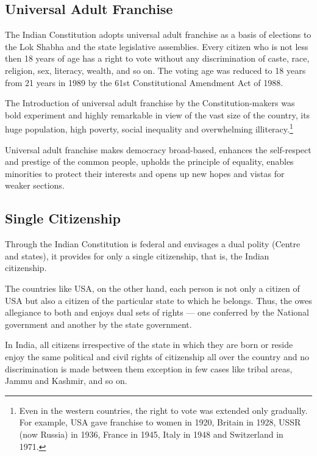 \subsection{Universal Adult Franchise}

The Indian Constitution adopts universal adult franchise as a basis of elections to the Lok Shabha and the state legislative assemblies. Every citizen who is not less then 18 years of age has a right to vote without any discrimination of caste, race, religion, sex, literacy, wealth, and so on. The voting age was reduced to 18 years from 21 years in 1989 by the 61st Constitutional Amendment Act of 1988.

The Introduction of universal adult franchise by the Constitution-makers was bold experiment and highly remarkable in view of the vast size of the country, its huge population, high poverty, social inequality and overwhelming illiteracy.\footnote{Even in the western countries, the right to vote was extended only gradually. For example, USA gave franchise to women in 1920, Britain in 1928, USSR (now Russia) in 1936, France in 1945, Italy in 1948 and Switzerland in 1971.}

Universal adult franchise makes democracy broad-based, enhances the self-respect and prestige of the common people, upholds the principle of equality, enables minorities to protect their interests and opens up new hopes and vistas for weaker sections.

\subsection{Single Citizenship}

Through the Indian Constitution is federal and envisages a dual polity (Centre and states), it provides for only a single citizenship, that is, the Indian citizenship.

The countries like USA, on the other hand, each person is not only a citizen of USA but also a citizen of the particular state to which he belongs. Thus, the owes allegiance to both and enjoys dual sets of rights — one conferred by the National government and another by the state government.

In India, all citizens irrespective of the state in which they are born or reside enjoy the same political and civil rights of citizenship all over the country and no discrimination is made between them exception in few cases like tribal areas, Jammu and Kashmir, and so on.

